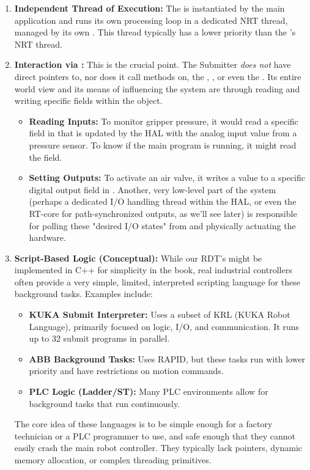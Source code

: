 \begin{enumerate}
    \item \textbf{Independent Thread of Execution:} The  is instantiated by the main application and runs its own processing loop in a dedicated NRT thread, managed by its own . This thread typically has a lower priority than the 's NRT thread.
    
    \item \textbf{Interaction via :} This is the crucial point. The Submitter \textit{does not} have direct pointers to, nor does it call methods on, the , , or even the . Its entire world view and its means of influencing the system are through reading and writing specific fields within the  object.
    \begin{itemize}
        \item \textbf{Reading Inputs:} To monitor gripper pressure, it would read a specific field in  that is updated by the HAL with the analog input value from a pressure sensor. To know if the main program is running, it might read the  field.
        \item \textbf{Setting Outputs:} To activate an air valve, it writes a  value to a specific digital output field in . Another, very low-level part of the system (perhaps a dedicated I/O handling thread within the HAL, or even the RT-core for path-synchronized outputs, as we'll see later) is responsible for polling these "desired I/O states" from  and physically actuating the hardware.
    \end{itemize}
    
    \item \textbf{Script-Based Logic (Conceptual):} While our RDT's  might be implemented in C++ for simplicity in the book, real industrial controllers often provide a very simple, limited, interpreted scripting language for these background tasks. Examples include:
    
    \begin{itemize}
        \item \textbf{KUKA Submit Interpreter:} Uses a subset of KRL (KUKA Robot Language), primarily focused on logic, I/O, and communication. It runs up to 32 submit programs in parallel.
        \item \textbf{ABB Background Tasks:} Uses RAPID, but these tasks run with lower priority and have restrictions on motion commands.
        \item \textbf{PLC Logic (Ladder/ST):} Many PLC environments allow for background tasks that run continuously.
    \end{itemize}
    
    The core idea of these languages is to be simple enough for a factory technician or a PLC programmer to use, and safe enough that they cannot easily crash the main robot controller. They typically lack pointers, dynamic memory allocation, or complex threading primitives.
\end{enumerate}

